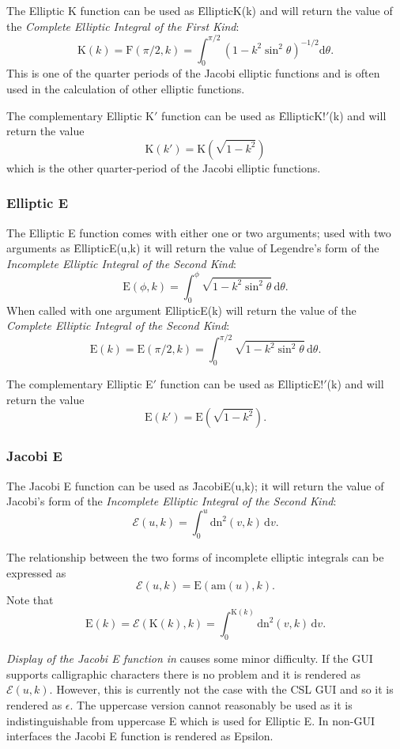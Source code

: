 The Elliptic K function can be used as \f{EllipticK(k)} and will
return the value of the \emph{Complete Elliptic Integral of the
First Kind}:
\[\mathrm{K}(k)=\mathrm{F}(\pi/2, k) =\int_0^{\pi/2}(1-k^2 \sin^2 \theta)^{-1/2}\mathrm{d}\theta.\]
This is one of the quarter periods of the Jacobi elliptic
functions and is often used in the calculation of other elliptic functions.

The complementary Elliptic K$'$ function can be used as \f{EllipticK!$'$(k)}
and will return the value
\[\mathrm{K}(k')=\mathrm{K}(\sqrt{1-k^2})\]
which is the other quarter-period of the Jacobi elliptic functions.

\subsubsection{Elliptic E}
\hypertarget{operator:ELLIPTICE}{}

The Elliptic E function comes with either one or two arguments;
used with two arguments as \f{EllipticE(u,k)}
it will return the value of Legendre's form of
the \emph{Incomplete Elliptic Integral of the Second Kind}:
\[\mathrm{E}(\phi, k)=\int_0^\phi \sqrt{1-k^2 \sin^2 \theta} \,\mathrm{d}\theta.\]
 When called with one argument \f{EllipticE(k)} will return the value of the
\emph{Complete Elliptic Integral of the Second Kind}:
\[\mathrm{E}(k)=\mathrm{E}(\pi/2, k) =
\int_0^{\pi/2} \sqrt{1-k^2 \sin^2 \theta} \,\mathrm{d}\theta.\]

The complementary Elliptic E$'$ function can be used as \f{EllipticE!$'$(k)}
and will return the value
\[\mathrm{E}(k') = \mathrm{E}(\sqrt{1-k^2}).\]

\subsubsection{Jacobi E}
\hypertarget{operator:JACOBIE}{}
The Jacobi E function can be used as  \f{JacobiE(u,k)};
it will return the value of Jacobi's form of
the \emph{Incomplete Elliptic Integral of the Second Kind}:
\[\mathcal{E}(u, k)=\int_0^u \mathrm{dn}^2 (v, k) \,\mathrm{d}v.\]

The relationship between the two forms of incomplete elliptic integrals can
be expressed as
\[\mathcal{E}(u, k) = \mathrm{E}(\mathrm{am}(u), k).\]
Note that
\[\mathrm{E}(k)=\mathcal{E}(\mathrm{K}(k), k)
=\int_0^{\mathrm{K}(k)} \mathrm{dn}^2(v, k) \,\mathrm{d}v.\]

\emph{Display of the Jacobi E function in \REDUCE} causes some minor difficulty.
If the GUI supports calligraphic characters there is no problem and it is rendered
as $\mathcal{E}(u,k)$.
However, this is currently not the case with the CSL GUI and so it is rendered as $\epsilon$.
The uppercase version cannot reasonably be used as it is indistinguishable from uppercase E
which is used for Elliptic E.
In non-GUI interfaces the Jacobi E function is rendered as Epsilon.

